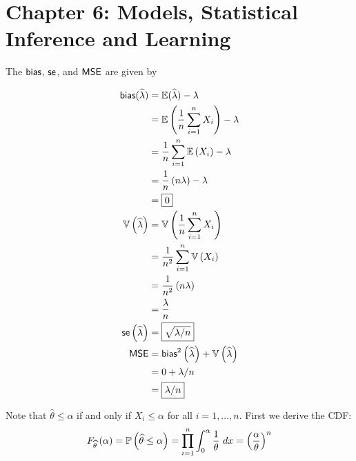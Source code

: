 \documentclass[a4paper]{article}
\begin{document}
\maketitle

\section{Chapter 6: Models, Statistical Inference and Learning}

The \(\operatorname{\textsf{bias}} \), \( \operatorname{\textsf{se}} \), and \(\operatorname{\textsf{MSE}} \) are given by

\begin{align*}
	\textsf{bias}(\widehat{\lambda}) &= \mathbb{E}(\widehat{\lambda}) - \lambda \\
		& = \mathbb{E}\left( \frac{1}{n} \sum_{i=1}^{n} X_{i} \right) - \lambda \\
		& = \frac{1}{n} \sum_{i=1}^{n} \mathbb{E}\left( X_{i} \right) - \lambda \\
		& = \frac{1}{n} \left( n \lambda  \right) - \lambda \\
		& = \boxed{0} \\
	\mathbb{V}\left( \widehat{\lambda } \right) & = \mathbb{V}\left( \frac{1}{n} \sum_{i=1}^{n} X_{i} \right) \\
		& = \frac{1}{n^{2}} \sum_{i=1}^{n} \mathbb{V}\left( X_{i} \right) \\
		& = \frac{1}{n^{2}} \left( n \lambda  \right) \\
		& = \frac{\lambda }{n} \\
	\operatorname{\textsf{se}} \left( \widehat{\lambda } \right) & = \boxed{\sqrt{\lambda / n}} \\
	\operatorname{\textsf{MSE}} & = \operatorname{\textsf{bias}}^{2} \left( \widehat{\lambda } \right) + \mathbb{V}\left( \widehat{\lambda } \right) \\
		& = 0 + \lambda / n \\
		& = \boxed{\lambda / n}
\end{align*}


Note that \(\widehat{\theta} \le \alpha \) if and only if \(X_{i} \le \alpha \) for all \(i = 1, \dots, n\). First we derive the \textsf{CDF}:
\[
	F_{\widehat{\theta}}\left( \alpha  \right) = \mathbb{P}\left( \widehat{\theta} \le \alpha  \right) = \prod_{i=1}^{n} \int^{\alpha }_{0} \frac{1}{\theta} \ dx = \left( \frac{\alpha }{\theta} \right)^{n} 
\]
\end{document}
